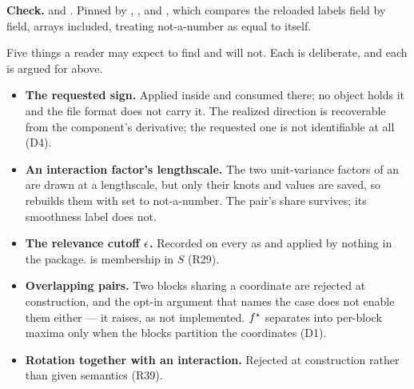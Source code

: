 \begin{sloppypar}
\textbf{Check.}  and
. Pinned by
,
,
 and
, which
compares the reloaded labels field by field, arrays included, treating
not-a-number as equal to itself.
\end{sloppypar}

\label{app:so:a4:notstored}

Five things a reader may expect to find and will not. Each is deliberate, and
each is argued for above.

\begin{itemize}
  \item \textbf{The requested sign.} Applied inside
     and consumed there; no object holds it and
    the file format does not carry it. The realized direction is recoverable
    from the component's derivative; the requested one is not identifiable at
    all (D4).
  \item \textbf{An interaction factor's lengthscale.} The two unit-variance
    factors of an  are drawn at a lengthscale, but only
    their knots and values are saved, so  rebuilds them with
     set to not-a-number. The pair's share survives; its
    smoothness label does not.
  \item \textbf{The relevance cutoff $\epsilon$.} Recorded on every
     as  and applied by nothing in the
    package.  is membership in $S$ (R29).
  \item \textbf{Overlapping pairs.} Two blocks sharing a coordinate are
    rejected at construction, and the opt-in argument that names the case does
    not enable them either --- it raises, as not implemented. $f^\star$
    separates into per-block maxima only when the blocks partition the
    coordinates (D1).
  \item \textbf{Rotation together with an interaction.} Rejected at
    construction rather than given semantics (R39).
\end{itemize}
